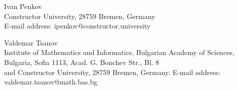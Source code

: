 \documentclass[12pt]{amsart}
\begin{document}
\vspace{0.2cm}

\noindent Ivan Penkov\\
Constructor University, 28759 Bremen, Germany\\
E-mail address: ipenkov@constructor.university

\vspace{0.2cm}

\noindent Valdemar Tsanov\\
Institute of Mathematics and Informatics, Bulgarian Academy of Sciences,\\
Bulgaria, Sofia 1113, Acad. G. Bonchev Str., Bl. 8\\
and Constructor University, 28759 Bremen, Germany. E-mail address: valdemar.tsanov@math.bas.bg\\
\end{document}
